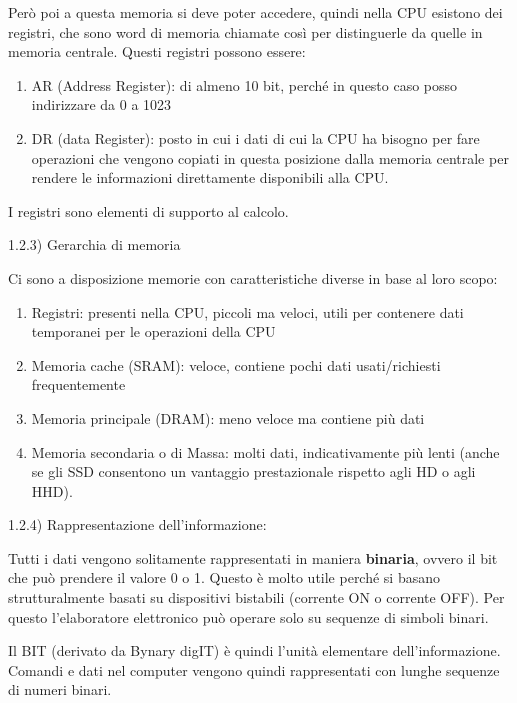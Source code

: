 \documentclass[
  paper=a4,
  oneside  ,captions=tableheading
]{scrbook}
\providecommand{\tightlist}{%
  \setlength{\itemsep}{0pt}\setlength{\parskip}{0pt}}
\begin{document}
Però poi a questa memoria si deve poter accedere, quindi nella CPU
esistono dei registri, che sono word di memoria chiamate così per
distinguerle da quelle in memoria centrale. Questi registri possono
essere:

\begin{enumerate}
\def\labelenumi{\arabic{enumi}.}
\tightlist
\item
  AR (Address Register): di almeno 10 bit, perché in questo caso posso
  indirizzare da 0 a 1023
\item
  DR (data Register): posto in cui i dati di cui la CPU ha bisogno per
  fare operazioni che vengono copiati in questa posizione dalla memoria
  centrale per rendere le informazioni direttamente disponibili alla
  CPU.
\end{enumerate}

I registri sono elementi di supporto al calcolo.

1.2.3) Gerarchia di memoria

Ci sono a disposizione memorie con caratteristiche diverse in base al
loro scopo:

\begin{enumerate}
\def\labelenumi{\arabic{enumi}.}
\tightlist
\item
  Registri: presenti nella CPU, piccoli ma veloci, utili per contenere
  dati temporanei per le operazioni della CPU
\item
  Memoria cache (SRAM): veloce, contiene pochi dati usati/richiesti
  frequentemente
\item
  Memoria principale (DRAM): meno veloce ma contiene più dati
\item
  Memoria secondaria o di Massa: molti dati, indicativamente più lenti
  (anche se gli SSD consentono un vantaggio prestazionale rispetto agli
  HD o agli HHD).
\end{enumerate}

1.2.4) Rappresentazione dell'informazione:

Tutti i dati vengono solitamente rappresentati in maniera
\textbf{binaria}, ovvero il bit che può prendere il valore 0 o 1. Questo
è molto utile perché si basano strutturalmente basati su dispositivi
bistabili (corrente ON o corrente OFF). Per questo l'elaboratore
elettronico può operare solo su sequenze di simboli binari.

Il BIT (derivato da Bynary digIT) è quindi l'unità elementare
dell'informazione. Comandi e dati nel computer vengono quindi
rappresentati con lunghe sequenze di numeri binari.
\end{document}
